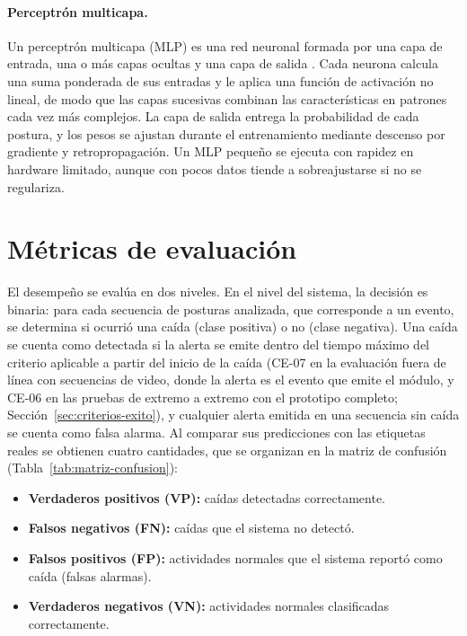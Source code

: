 \documentclass[12pt,a4paper,oneside]{book}
\theoremstyle{plain}
\theoremstyle{definition}
\theoremstyle{remark}
\begin{document}
\paragraph{Perceptrón multicapa.} Un perceptrón multicapa (MLP) es una red neuronal formada por una capa de entrada, una o más capas ocultas y una capa de salida \parencite{goodfellow2016deep}. Cada neurona calcula una suma ponderada de sus entradas y le aplica una función de activación no lineal, de modo que las capas sucesivas combinan las características en patrones cada vez más complejos. La capa de salida entrega la probabilidad de cada postura, y los pesos se ajustan durante el entrenamiento mediante descenso por gradiente y retropropagación. Un MLP pequeño se ejecuta con rapidez en hardware limitado, aunque con pocos datos tiende a sobreajustarse si no se regulariza.

\section{Métricas de evaluación}
\label{sec:metricas}

El desempeño se evalúa en dos niveles. En el nivel del sistema, la decisión es binaria: para cada secuencia de posturas analizada, que corresponde a un evento, se determina si ocurrió una caída (clase positiva) o no (clase negativa). Una caída se cuenta como detectada si la alerta se emite dentro del tiempo máximo del criterio aplicable a partir del inicio de la caída (CE-07 en la evaluación fuera de línea con secuencias de video, donde la alerta es el evento que emite el módulo, y CE-06 en las pruebas de extremo a extremo con el prototipo completo; Sección~\ref{sec:criterios-exito}), y cualquier alerta emitida en una secuencia sin caída se cuenta como falsa alarma. Al comparar sus predicciones con las etiquetas reales se obtienen cuatro cantidades, que se organizan en la matriz de confusión (Tabla~\ref{tab:matriz-confusion}):

\begin{itemize}
  \item \textbf{Verdaderos positivos (VP):} caídas detectadas correctamente.
  \item \textbf{Falsos negativos (FN):} caídas que el sistema no detectó.
  \item \textbf{Falsos positivos (FP):} actividades normales que el sistema reportó como caída (falsas alarmas).
  \item \textbf{Verdaderos negativos (VN):} actividades normales clasificadas correctamente.
\end{itemize}
\end{document}
